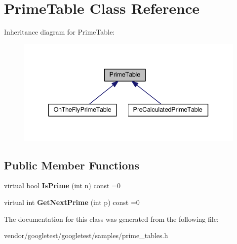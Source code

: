 \hypertarget{classPrimeTable}{}\section{Prime\+Table Class Reference}
\label{classPrimeTable}


Inheritance diagram for Prime\+Table\+:\nopagebreak
\begin{figure}[H]
\begin{center}
\leavevmode
\includegraphics[width=336pt]{classPrimeTable__inherit__graph}
\end{center}
\end{figure}
\subsection*{Public Member Functions}
\begin{DoxyCompactItemize}
\item 
virtual bool {\bfseries Is\+Prime} (int n) const =0\hypertarget{classPrimeTable_a2ab9243364ded0c51541f641b2df362a}{}\label{classPrimeTable_a2ab9243364ded0c51541f641b2df362a}

\item 
virtual int {\bfseries Get\+Next\+Prime} (int p) const =0\hypertarget{classPrimeTable_ae537c939f56617d8937d57bbbae3ab30}{}\label{classPrimeTable_ae537c939f56617d8937d57bbbae3ab30}

\end{DoxyCompactItemize}


The documentation for this class was generated from the following file\+:\begin{DoxyCompactItemize}
\item 
vendor/googletest/googletest/samples/prime\+\_\+tables.\+h\end{DoxyCompactItemize}
